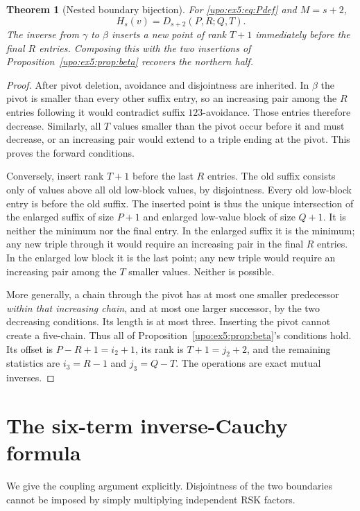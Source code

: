 \documentclass[11pt,letterpaper]{article}
\newtheorem{theorem}{Theorem}[section]
\theoremstyle{remark}\newtheorem{remark}[theorem]{Remark}
\numberwithin{equation}{section}
\begin{document}
\begin{theorem}[Nested boundary bijection]\label{upo:ex5:thm:D}
For \eqref{upo:ex5:eq:Pdef} and $M=s+2$,
\begin{equation}\label{upo:ex5:eq:HD}
 H_s(v)=D_{s+2}(P,R;Q,T).
\end{equation}
The inverse from $\gamma$ to $\beta$ inserts a new point of rank $T+1$
immediately before the final $R$ entries. Composing this with the two
insertions of Proposition~\ref{upo:ex5:prop:beta} recovers the northern half.
\end{theorem}
\begin{proof}
After pivot deletion, avoidance and disjointness are inherited. In
$\beta$ the pivot is smaller than every other suffix entry, so an
increasing pair among the $R$ entries following it would contradict
suffix $123$-avoidance. Those entries therefore decrease. Similarly,
all $T$ values smaller than the pivot occur before it and must decrease,
or an increasing pair would extend to a triple ending at the pivot.
This proves the forward conditions.

Conversely, insert rank $T+1$ before the last $R$ entries. The old
suffix consists only of values above all old low-block values, by
disjointness. Every old low-block entry is before the old suffix.
The inserted point is thus the unique intersection of the enlarged
suffix of size $P+1$ and enlarged low-value block of size $Q+1$.
It is neither the minimum nor the final entry. In the enlarged suffix
it is the minimum; any new triple through it would require an
increasing pair in the final $R$ entries. In the enlarged low block
it is the last point; any new triple would require an increasing pair
among the $T$ smaller values. Neither is possible.

More generally, a chain through the pivot has at most one smaller
predecessor \emph{within that increasing chain}, and at most one larger
successor, by the two decreasing conditions. Its length is at most
three. Inserting the pivot cannot create a five-chain. Thus all of
Proposition~\ref{upo:ex5:prop:beta}'s conditions hold. Its offset is
$P-R+1=i_2+1$, its rank is $T+1=j_2+2$, and the remaining statistics
are $i_3=R-1$ and $j_3=Q-T$. The operations are exact mutual inverses.
\end{proof}

\section{The six-term inverse-Cauchy formula}\label{upo:ex5:sec:sym}
We give the coupling argument explicitly. Disjointness of the two
boundaries cannot be imposed by simply multiplying independent RSK
factors.
\end{document}
